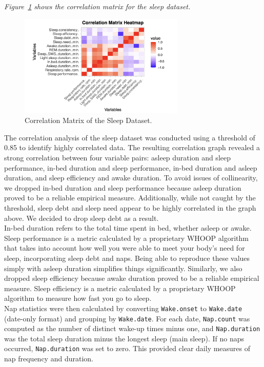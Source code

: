 \documentclass{article}
\begin{document}
\textit{Figure~\ref{fig:correlation-matrix-sleep} shows the correlation matrix for the sleep dataset.} \\

\begin{figure}[h!]
  \centering
  \includegraphics[width=0.7\textwidth]{images/sleepcorrelation.png}
  \caption{Correlation Matrix of the Sleep Dataset.}
  \label{fig:correlation-matrix-sleep}
\end{figure}

The correlation analysis of the sleep dataset was conducted using a threshold of 0.85 to identify highly correlated data. The resulting correlation graph revealed a strong correlation between four variable pairs: asleep duration and sleep performance, in-bed duration and sleep performance, in-bed duration and asleep duration, and sleep efficiency and awake duration. To avoid issues of collinearity, we dropped in-bed duration and sleep performance because asleep duration proved to be a reliable empirical measure. Additionally, while not caught by the threshold, sleep debt and sleep need appear to be highly correlated in the graph above. We decided to drop sleep debt as a result. \\

In-bed duration refers to the total time spent in bed, whether asleep or awake. Sleep performance is a metric calculated by a proprietary WHOOP algorithm that takes into account how well you were able to meet your body's need for sleep, incorporating sleep debt and naps. Being able to reproduce these values simply with asleep duration simplifies things significantly. Similarly, we also dropped sleep efficiency because awake duration proved to be a reliable empirical measure. Sleep efficiency is a metric calculated by a proprietary WHOOP algorithm to measure how fast you go to sleep. \\

Nap statistics were then calculated by converting \texttt{Wake.onset} to \texttt{Wake.date} (date-only format) and grouping by \texttt{Wake.date}. For each date, \texttt{Nap.count} was computed as the number of distinct wake-up times minus one, and \texttt{Nap.duration} was the total sleep duration minus the longest sleep (main sleep). If no naps occurred, \texttt{Nap.duration} was set to zero. This provided clear daily measures of nap frequency and duration. \\
\end{document}
